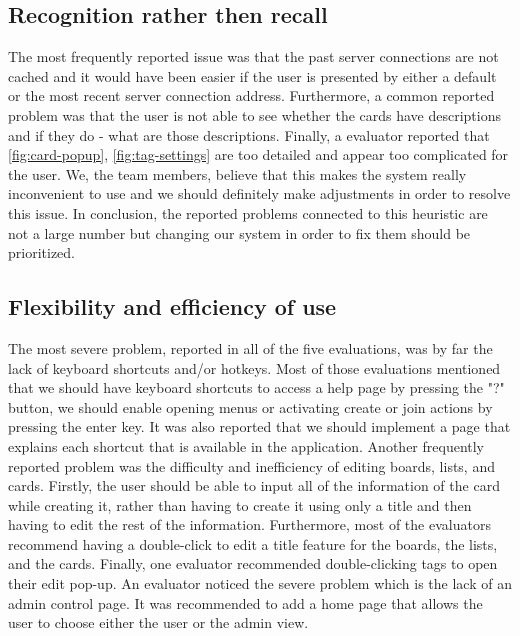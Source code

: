 \subsection{Recognition rather then recall}
The most frequently reported issue was that the past server connections are not cached and it would have been easier if the user is presented by either a default or the most recent server connection address. Furthermore, a common reported problem was that the user is not able to see whether the cards have descriptions and if they do - what are those descriptions. Finally, a evaluator reported that \ref{fig:card-popup}, \ref{fig:tag-settings} are too detailed and appear too complicated for the user. We, the team members, believe that this makes the system really inconvenient to use and we should definitely make adjustments in order to resolve this issue. In conclusion, the reported problems connected to this heuristic are not a large number but changing our system in order to fix them should be prioritized. 

\subsection{Flexibility and efficiency of use}
The most severe problem, reported in all of the five evaluations, was by far the lack of keyboard shortcuts and/or hotkeys. Most of those evaluations mentioned that we should have keyboard shortcuts to access a help page by pressing the "?" button, we should enable opening menus or activating create or join actions by pressing the enter key. It was also reported that we should implement a page that explains each shortcut that is available in the application. Another frequently reported problem was the difficulty and inefficiency of editing boards, lists, and cards. Firstly, the user should be able to input all of the information of the card while creating it, rather than having to create it using only a title and then having to edit the rest of the information. Furthermore, most of the evaluators recommend having a double-click to edit a title feature for the boards, the lists, and the cards. Finally, one evaluator recommended double-clicking tags to open their edit pop-up. An evaluator noticed the severe problem which is the lack of an admin control page. It was recommended to add a home page that allows the user to choose either the user or the admin view.

